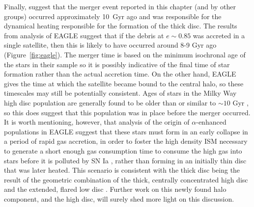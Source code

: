 Finally, \citet{2018arXiv180606038H} suggest that the merger
event reported in this chapter (and by other groups) occurred
approximately 10~Gyr ago and was responsible for the dynamical
heating responsible for the formation of the thick disc. The results
from analysis of EAGLE suggest that if the debris at $e \sim 0.85$
was accreted in a single satellite, then this is likely to have
occurred around 8-9 Gyr ago (Figure~\ref{fig:eagle}).  The
\citet{2018arXiv180606038H} merger time is based on the minimum
isochronal age of the stars in their sample so it is possibly
indicative of the final time of star formation rather than the
actual accretion time.  On the other hand, EAGLE gives the time at
which the satellite became bound to the central halo, so these
timescales may still be potentially consistent.  Ages of stars in the Milky
Way high \afe{} disc population are generally found to be older
than or similar to $\sim 10$ Gyr
\citep[e.g.][]{2013A&A...560A.109H,2016MNRAS.456.3655M,2017arXiv170600018M},
so this does suggest that this population was in place before the
merger occurred. It is worth mentioning, however, that analysis of
the origin of $\alpha$-enhanced populations in EAGLE suggest that
these stars must form in an early collapse in a period of rapid gas
accretion, in order to foster the high density ISM necessary to
generate a short enough gas consumption time to consume the high
\afe{} gas into stars before it is polluted by SN Ia
\citep{2018MNRAS.477.5072M}, rather than forming in an
initially thin disc that was later heated. This scenario is
consistent with the thick disc being the result of the geometric
combination of the thick, centrally concentrated high \afe{} disc
and the extended, flared low \afe{} disc
\citep[e.g][]{2017arXiv170600018M,2016arXiv160901168M,2015ApJ...804L...9M}.
Further work on this newly found halo component, and the high \afe{}
disc, will surely shed more light on this discussion.






